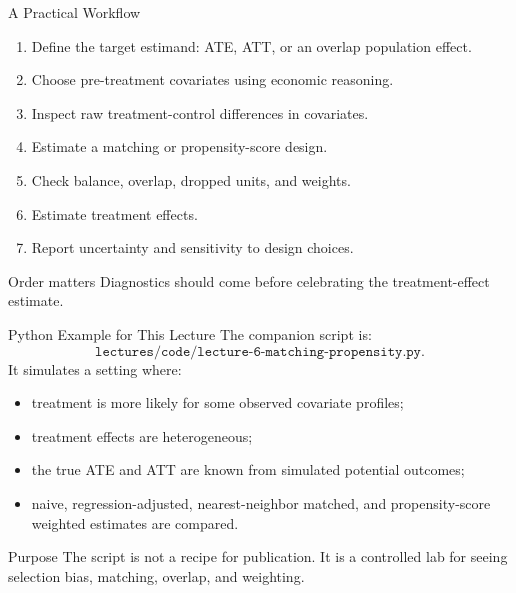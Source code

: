 \documentclass[11pt,aspectratio=169]{beamer}
\begin{document}
\begin{frame}{A Practical Workflow}
  \begin{enumerate}
    \item Define the target estimand: ATE, ATT, or an overlap population effect.
    \item Choose pre-treatment covariates using economic reasoning.
    \item Inspect raw treatment-control differences in covariates.
    \item Estimate a matching or propensity-score design.
    \item Check balance, overlap, dropped units, and weights.
    \item Estimate treatment effects.
    \item Report uncertainty and sensitivity to design choices.
  \end{enumerate}
  \begin{block}{Order matters}
    Diagnostics should come before celebrating the treatment-effect estimate.
  \end{block}
\end{frame}

\begin{frame}{Python Example for This Lecture}
  The companion script is:
  \[
    \texttt{lectures/code/lecture-6-matching-propensity.py}.
  \]
  It simulates a setting where:
  \begin{itemize}
    \item treatment is more likely for some observed covariate profiles;
    \item treatment effects are heterogeneous;
    \item the true ATE and ATT are known from simulated potential outcomes;
    \item naive, regression-adjusted, nearest-neighbor matched, and propensity-score weighted estimates are compared.
  \end{itemize}
  \begin{block}{Purpose}
    The script is not a recipe for publication. It is a controlled lab for seeing selection bias, matching, overlap, and weighting.
  \end{block}
\end{frame}
\end{document}
